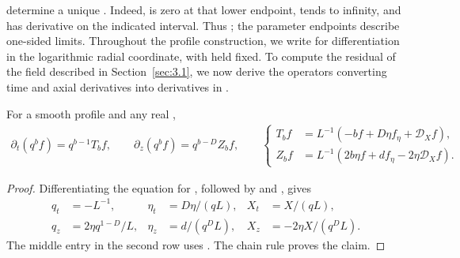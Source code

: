 %
determine a unique . Indeed,
 is zero at that lower endpoint, tends to
infinity, and has derivative
 on the indicated interval.
Thus ; the parameter endpoints
 describe one-sided limits. Throughout the
profile construction, we write
 for differentiation in the logarithmic
radial coordinate, with  held fixed. To compute the
residual of the field described in Section~\ref{sec:3.1}, we now derive the
operators converting time and axial derivatives into derivatives in
.

\begin{lemma}\label{lem:4.1}
For a smooth profile  and any real
,
\begin{equation}
\begin{gathered}
 \partial_t(q^bf)=q^{b-1}T_bf,\qquad
 \partial_z(q^bf)=q^{b-D}Z_bf,\qquad
 \left\{
 \begin{aligned}
 T_bf&=L^{-1}(-bf+D\eta f_\eta+\mathcal D_Xf),\\
 Z_bf&=L^{-1}(2b\eta f+df_\eta-2\eta \mathcal D_Xf).
 \end{aligned}
 \right.
\end{gathered}
\tag{4.2}\label{eq:4.2}
\end{equation}
\end{lemma}

\begin{proof}
Differentiating the equation for , followed by
 and
, gives
\[
\begin{aligned}
 q_t&=-L^{-1},& \eta_t&=D\eta/(qL),& X_t&=X/(qL),\\
 q_z&=2\eta q^{1-D}/L,& \eta_z&=d/(q^DL),& X_z&=-2\eta X/(q^DL).
\end{aligned}
\]
The middle entry in the second row uses
. The chain rule proves the claim.
\end{proof}

